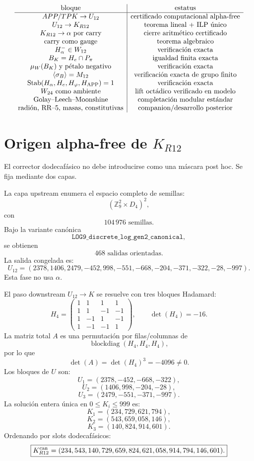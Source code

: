 \documentclass[11pt,a4paper]{article}
\newcommand{\Z}{\mathbb Z}
\newcommand{\Stab}{\operatorname{Stab}}
\begin{document}
\[
\begin{array}{c|c}
\text{bloque} & \text{estatus}\\
\hline
APP/TPK\to U_{12} & \text{certificado computacional alpha-free}\\
U_{12}\to K_{R12} & \text{teorema lineal + ILP único}\\
K_{R12}\to\alpha\text{ por carry} & \text{cierre aritmético certificado}\\
\text{carry como gauge} & \text{teorema algebraico}\\
H_\alpha^-\in W_{12} & \text{verificación exacta}\\
B_K=H_e\cap P_\pi & \text{igualdad finita exacta}\\
\mu_W(B_K)\text{ y pétalo negativo} & \text{verificación exacta}\\
\langle\sigma_B\rangle=M_{12} & \text{verificación exacta de grupo finito}\\
\Stab(H_\alpha,H_e,H_\varphi,H_{\rm APP})=1 & \text{verificación exacta}\\
W_{24}\text{ como ambiente} & \text{lift octádico verificado en modelo}\\
\text{Golay--Leech--Moonshine} & \text{completación modular estándar}\\
\text{radión, RR--5, masas, constitutivas} & \text{companion/desarrollo posterior}
\end{array}
\]

\section{Origen alpha-free de \(K_{R12}\)}

El corrector dodecafásico no debe introducirse como una máscara post hoc. Se fija mediante dos capas.

La capa upstream enumera el espacio completo de semillas:
\[
(\Z_9^2\times D_4)^2,
\]
con
\[
104\,976\text{ semillas}.
\]
Bajo la variante canónica
\[
\texttt{LOG9\_discrete\_log\_gen2\_canonical},
\]
se obtienen
\[
468\text{ salidas orientadas}.
\]
La salida congelada es:
\[
U_{12}=(2378,1406,2479,-452,998,-551,-668,-204,-371,-322,-28,-997).
\]
Esta fase no usa \(\alpha\).

El paso downstream \(U_{12}\to K\) se resuelve con tres bloques Hadamard:
\[
H_4=
\begin{pmatrix}
1&1&1&1\\
1&1&-1&-1\\
1&-1&1&-1\\
1&-1&-1&1
\end{pmatrix},
\qquad
\det(H_4)=-16.
\]
La matriz total \(A\) es una permutación por filas/columnas de
\[
\operatorname{blockdiag}(H_4,H_4,H_4),
\]
por lo que
\[
\det(A)=\det(H_4)^3=-4096\neq0.
\]
Los bloques de \(U\) son:
\[
U_1=(2378,-452,-668,-322),
\]
\[
U_2=(1406,998,-204,-28),
\]
\[
U_3=(2479,-551,-371,-997).
\]
La solución entera única en \(0\le K_i\le999\) es:
\[
K_1=(234,729,621,794),
\]
\[
K_2=(543,659,058,146),
\]
\[
K_3=(140,824,914,601).
\]
Ordenando por slots dodecafásicos:
\[
\boxed{
K_{R12}^{\rm can}
=
(234,543,140,729,659,824,621,058,914,794,146,601).
}
\]
\end{document}
